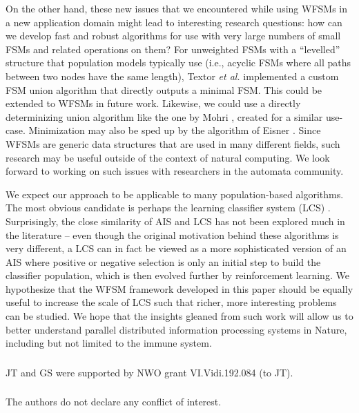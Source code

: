 \documentclass{llncs}
\begin{document}
On the other hand, these new issues that we encountered while using WFSMs in a new 
application domain might lead to interesting research questions: how can we develop
fast and robust algorithms for use with very large numbers of small FSMs and related
operations on them? For unweighted FSMs with a ``levelled'' structure that population
models typically use
(i.e., acyclic FSMs where all paths between two nodes have the same length),
Textor \emph{et al.} \cite{Textor2014} implemented a custom FSM union algorithm that directly 
outputs a minimal FSM. This could be extended to WFSMs in future work. 
Likewise, we could use a directly 
determinizing union algorithm like the one by Mohri \cite{Mohri1996}, created for a 
similar use-case. Minimization may also be sped up by the algorithm of 
Eisner \cite{Eisner2003}. Since WFSMs are 
generic data structures that are used in many different fields, such research may be 
useful outside of the context of natural computing. We look forward to working on 
such issues with researchers in the automata community. 


We expect our approach to be applicable to many population-based algorithms. The most obvious candidate is perhaps the learning classifier system (LCS) \cite{Urbanowicz2009}. Surprisingly, the close similarity of AIS and LCS has not been explored much in the literature -- even though the original motivation behind these algorithms is very different, a LCS can in fact be viewed as a more sophisticated version of an AIS where positive or negative selection is only an initial step to build the classifier population, which is then evolved further by reinforcement learning. We hypothesize that the WFSM framework developed in this paper should be equally useful to increase the scale of LCS such that richer, more interesting problems can be studied. We hope that the insights gleaned from such work will allow us to better understand 
parallel distributed information processing systems in Nature, including but not limited to the immune 
system.


\begin{credits}
  \subsubsection*{\ackname}
  JT and GS were supported by NWO grant VI.Vidi.192.084 (to JT).
  \subsubsection*{\discintname}
  The authors do not declare any conflict of interest.
\end{credits}


\end{document}
